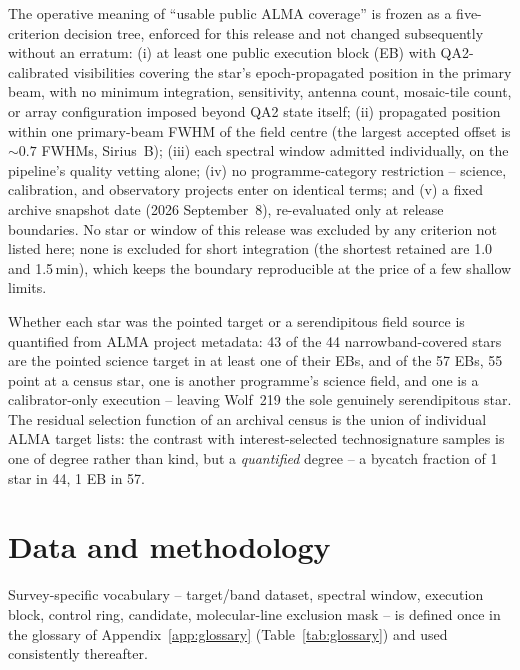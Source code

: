\documentclass{openjournal}
\begin{document}
The operative meaning of ``usable public ALMA coverage'' is frozen as
a five-criterion decision tree, enforced for this release and not
changed subsequently without an erratum: (i) at least one public
execution block (EB) with QA2-calibrated visibilities covering the
star's epoch-propagated position in the primary beam, with no minimum
integration, sensitivity, antenna count, mosaic-tile count, or array
configuration imposed beyond QA2 state itself; (ii) propagated
position within one primary-beam FWHM of the field centre (the
largest accepted offset is ${\sim}0.7$ FWHMs, Sirius~B); (iii) each
spectral window admitted individually, on the pipeline's quality
vetting alone; (iv) no programme-category restriction -- science,
calibration, and observatory projects enter on identical terms; and
(v) a fixed archive snapshot date (2026 September~8), re-evaluated
only at release boundaries. No star or window of this release was
excluded by any criterion not listed here; none is excluded for short
integration (the shortest retained are 1.0 and 1.5\,min), which keeps
the boundary reproducible at the price of a few shallow limits.

Whether each star was the pointed target or a serendipitous field
source is quantified from ALMA project metadata: 43 of the 44
narrowband-covered stars are the pointed science target in at least
one of their EBs, and of the 57 EBs, 55 point at a census star, one is
another programme's science field, and one is a calibrator-only
execution -- leaving Wolf~219 the sole genuinely serendipitous star.
The residual selection function of an archival census is the union of
individual ALMA target lists: the contrast with interest-selected
technosignature samples is one of degree rather than kind, but a
\emph{quantified} degree -- a bycatch fraction of 1 star in 44, 1 EB
in 57.



\section{Data and methodology}
\label{sec:method}

Survey-specific vocabulary -- target/band dataset, spectral window,
execution block, control ring, candidate, molecular-line exclusion
mask -- is defined once in the glossary of Appendix~\ref{app:glossary}
(Table~\ref{tab:glossary}) and used consistently thereafter.
\end{document}
